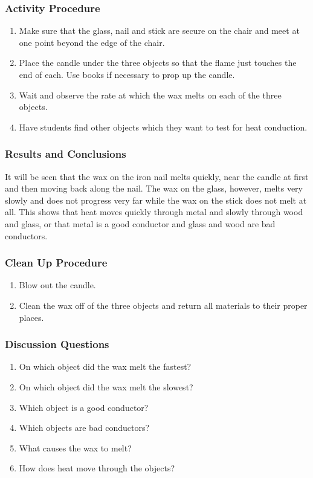 \subsubsection*{Activity Procedure}
\begin{enumerate}
\item{Make sure that the glass, nail and stick are secure on the chair and meet at one point beyond the edge of the chair.} 
\item{Place the candle under the three objects so that the flame just touches the end of each. Use books if necessary to prop up the candle.} 
\item{Wait and observe the rate at which the wax melts on each of the three objects.} 
\item{Have students find other objects which they want to test for heat conduction.} 
\end{enumerate}

\subsubsection*{Results and Conclusions}
It will be seen that the wax on the iron nail melts quickly, near the candle at first and then moving back along the nail. The wax on the glass, however, melts very slowly and does not progress very far while the wax on the stick does not melt at all.  
This shows that heat moves quickly through metal and slowly through wood and glass, or that metal is a good conductor and glass and wood are bad conductors.  

\subsubsection*{Clean Up Procedure}
\begin{enumerate}
\item{Blow out the candle.} 
\item{Clean the wax off of the three objects and return all materials to their proper places.} 
\end{enumerate}

\subsubsection*{Discussion Questions}
\begin{enumerate}
\item{On which object did the wax melt the fastest?}
\item{On which object did the wax melt the slowest?}
\item{Which object is a good conductor?}
\item{Which objects are bad conductors?}
\item{What causes the wax to melt?}
\item{How does heat move through the objects?}
\end{enumerate}

